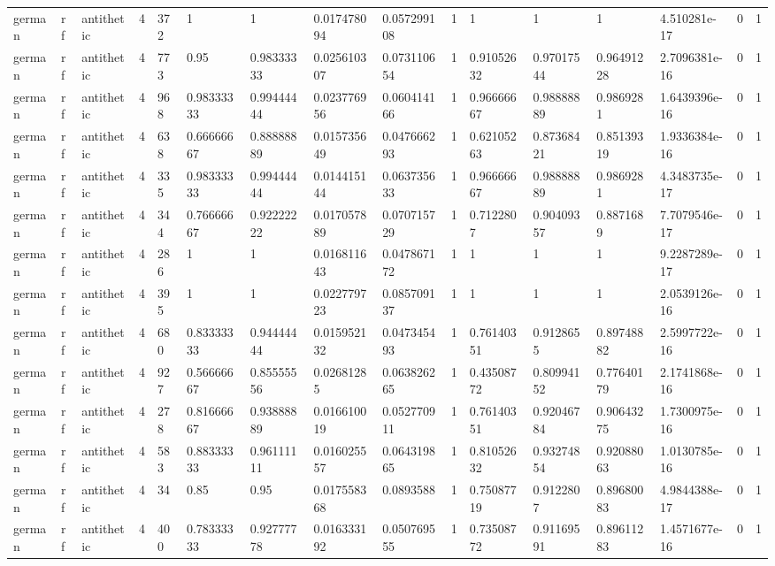 \begin{tabular}{llllllllllllllll}
german & rf & antithetic & 4 & 372 & 1 & 1 & 0.017478094 & 0.057299108 & 1 & 1 & 1 & 1 & 4.510281e-17 & 0 & 1 \\
german & rf & antithetic & 4 & 773 & 0.95 & 0.98333333 & 0.025610307 & 0.073110654 & 1 & 0.91052632 & 0.97017544 & 0.96491228 & 2.7096381e-16 & 0 & 1 \\
german & rf & antithetic & 4 & 968 & 0.98333333 & 0.99444444 & 0.023776956 & 0.060414166 & 1 & 0.96666667 & 0.98888889 & 0.9869281 & 1.6439396e-16 & 0 & 1 \\
german & rf & antithetic & 4 & 638 & 0.66666667 & 0.88888889 & 0.015735649 & 0.047666293 & 1 & 0.62105263 & 0.87368421 & 0.85139319 & 1.9336384e-16 & 0 & 1 \\
german & rf & antithetic & 4 & 335 & 0.98333333 & 0.99444444 & 0.014415144 & 0.063735633 & 1 & 0.96666667 & 0.98888889 & 0.9869281 & 4.3483735e-17 & 0 & 1 \\
german & rf & antithetic & 4 & 344 & 0.76666667 & 0.92222222 & 0.017057889 & 0.070715729 & 1 & 0.7122807 & 0.90409357 & 0.8871689 & 7.7079546e-17 & 0 & 1 \\
german & rf & antithetic & 4 & 286 & 1 & 1 & 0.016811643 & 0.047867172 & 1 & 1 & 1 & 1 & 9.2287289e-17 & 0 & 1 \\
german & rf & antithetic & 4 & 395 & 1 & 1 & 0.022779723 & 0.085709137 & 1 & 1 & 1 & 1 & 2.0539126e-16 & 0 & 1 \\
german & rf & antithetic & 4 & 680 & 0.83333333 & 0.94444444 & 0.015952132 & 0.047345493 & 1 & 0.76140351 & 0.9128655 & 0.89748882 & 2.5997722e-16 & 0 & 1 \\
german & rf & antithetic & 4 & 927 & 0.56666667 & 0.85555556 & 0.02681285 & 0.063826265 & 1 & 0.43508772 & 0.80994152 & 0.77640179 & 2.1741868e-16 & 0 & 1 \\
german & rf & antithetic & 4 & 278 & 0.81666667 & 0.93888889 & 0.016610019 & 0.052770911 & 1 & 0.76140351 & 0.92046784 & 0.90643275 & 1.7300975e-16 & 0 & 1 \\
german & rf & antithetic & 4 & 583 & 0.88333333 & 0.96111111 & 0.016025557 & 0.064319865 & 1 & 0.81052632 & 0.93274854 & 0.92088063 & 1.0130785e-16 & 0 & 1 \\
german & rf & antithetic & 4 & 34 & 0.85 & 0.95 & 0.017558368 & 0.0893588 & 1 & 0.75087719 & 0.9122807 & 0.89680083 & 4.9844388e-17 & 0 & 1 \\
german & rf & antithetic & 4 & 400 & 0.78333333 & 0.92777778 & 0.016333192 & 0.050769555 & 1 & 0.73508772 & 0.91169591 & 0.89611283 & 1.4571677e-16 & 0 & 1 \\

\end{tabular}
